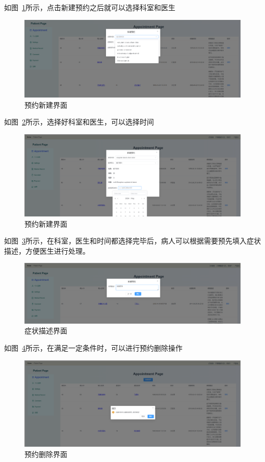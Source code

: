 如图~\ref{a4}所示，点击新建预约之后就可以选择科室和医生
\begin{figure}[!h]
	\centering
	\includegraphics[width=\textwidth]{figures/a5.png}
	\caption{预约新建界面}
	\label{a4}
\end{figure}

如图~\ref{a5}所示，选择好科室和医生，可以选择时间
\begin{figure}[!h]
	\centering
	\includegraphics[width=\textwidth]{figures/a6.png}
	\caption{预约新建界面}
	\label{a5}
\end{figure}

如图~\ref{a6}所示，在科室，医生和时间都选择完毕后，病人可以根据需要预先填入症状描述，方便医生进行处理。
\begin{figure}[!h]
	\centering
	\includegraphics[width=\textwidth]{figures/a7.png}
	\caption{症状描述界面}
	\label{a6}
\end{figure}

如图~\ref{a7}所示，在满足一定条件时，可以进行预约删除操作
\begin{figure}[!h]
	\centering
	\includegraphics[width=\textwidth]{figures/a8.png}
	\caption{预约删除界面}
	\label{a7}
\end{figure}

